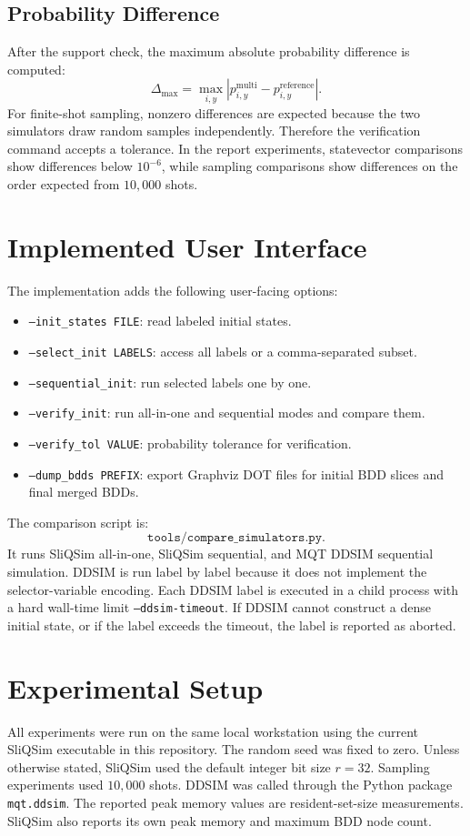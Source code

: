 \documentclass[sigconf,nonacm]{acmart}
\begin{document}
\subsection{Probability Difference}
After the support check, the maximum absolute probability difference is computed:
\[
  \Delta_{\max}
  =
  \max_{i,y}
  \left|
    p_{i,y}^{\mathrm{multi}}
    -
    p_{i,y}^{\mathrm{reference}}
  \right|.
\]
For finite-shot sampling, nonzero differences are expected because the two simulators draw random samples independently. Therefore the verification command accepts a tolerance. In the report experiments, statevector comparisons show differences below $10^{-6}$, while sampling comparisons show differences on the order expected from $10{,}000$ shots.

\section{Implemented User Interface}
The implementation adds the following user-facing options:
\begin{itemize}
  \item \texttt{--init\_states FILE}: read labeled initial states.
  \item \texttt{--select\_init LABELS}: access all labels or a comma-separated subset.
  \item \texttt{--sequential\_init}: run selected labels one by one.
  \item \texttt{--verify\_init}: run all-in-one and sequential modes and compare them.
  \item \texttt{--verify\_tol VALUE}: probability tolerance for verification.
  \item \texttt{--dump\_bdds PREFIX}: export Graphviz DOT files for initial BDD slices and final merged BDDs.
\end{itemize}

The comparison script is:
\[
  \texttt{tools/compare\_simulators.py}.
\]
It runs SliQSim all-in-one, SliQSim sequential, and MQT DDSIM sequential simulation. DDSIM is run label by label because it does not implement the selector-variable encoding. Each DDSIM label is executed in a child process with a hard wall-time limit \texttt{--ddsim-timeout}. If DDSIM cannot construct a dense initial state, or if the label exceeds the timeout, the label is reported as aborted.

\section{Experimental Setup}
All experiments were run on the same local workstation using the current SliQSim executable in this repository. The random seed was fixed to zero. Unless otherwise stated, SliQSim used the default integer bit size $r=32$. Sampling experiments used $10{,}000$ shots. DDSIM was called through the Python package \texttt{mqt.ddsim}. The reported peak memory values are resident-set-size measurements. SliQSim also reports its own peak memory and maximum BDD node count.
\end{document}
